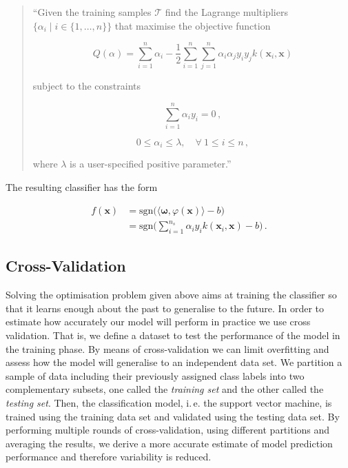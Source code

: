 \begin{quote}

``Given the training samples $\mathcal{T}$ find the Lagrange multipliers $\{\alpha_i \mid i \in \{1, \dots, n\}\}$ that maximise the objective function

\begin{equation}
Q(\alpha) =  \sum_{i=1}^n \alpha_i - \frac{1}{2} \sum_{i=1}^n\sum_{j=1}^n \alpha_i \alpha_j y_i y_j k(\bm{x}_i, \bm{x})
\end{equation}

\noindent
subject to the constraints

\begin{equation}
\sum_{i=1}^n \alpha_i y_i = 0\,,
\end{equation}

\begin{equation}
 0 \leq \alpha_i \leq \lambda, \quad \forall \ 1 \leq i \leq n\,,
 \label{eq:lambda}
\end{equation}

\noindent
where $\lambda$ is a user-specified positive parameter.''

\end{quote}

\noindent
The resulting classifier has the form

\begin{equation}
\begin{split}
f(\bm{x}) & = \mbox{sgn}\big(\langle \bm{\omega} , \varphi(\bm{x}) \rangle - b\big) \\
& = \mbox{sgn}\bigg(\sum_{i=1}^{n_s} \alpha_i y_i k(\bm{x}_i, \bm{x}) - b\bigg) \,.
\end{split}
\label{eq:svm_classifier}
\end{equation}


\subsection{Cross-Validation}

Solving the optimisation problem given above aims at training the classifier so that it learns enough about the past to generalise to the future. In order to estimate how accurately our model will perform in practice we use cross validation. That is, we define a dataset to test the performance of the model in the training phase. By means of cross-validation we can limit overfitting and assess how the model will generalise to an independent data set. We partition a sample of data including their previously assigned class labels into two complementary subsets, one called the \emph{training set} and the other called the \emph{testing set}. Then, the classification model, i.\,e. the support vector machine, is trained using the training data set and validated using the testing data set. By performing multiple rounds of cross-validation, using different partitions and averaging the results, we derive a more accurate estimate of model prediction performance and therefore variability is reduced.


